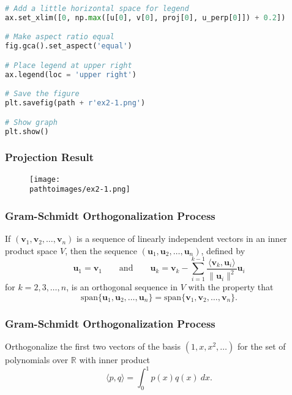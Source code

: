 \documentclass{beamer}
\newcommand{\pathtoimages}{/Users/charlesrambo/Desktop/Bootcamp24/Images}
\begin{document}
\begin{frame}[fragile]
\begin{multicols}{2}
\begin{lstlisting}[language=Python]
# Add a little horizontal space for legend
ax.set_xlim([0, np.max([u[0], v[0], proj[0], u_perp[0]]) + 0.2])

# Make aspect ratio equal
fig.gca().set_aspect('equal')

# Place legend at upper right
ax.legend(loc = 'upper right')

# Save the figure
plt.savefig(path + r'ex2-1.png')

# Show graph
plt.show()
\end{lstlisting}
\end{multicols}

\end{frame}

\begin{frame}[fragile]
\frametitle{Projection Result}
\begin{figure}
\centering
\texttt{[image: \\pathtoimages/ex2-1.png]}
\end{figure}
\end{frame}


\begin{frame}
\frametitle{Gram-Schmidt Orthogonalization Process}
\begin{Theorem}
If $({\boldsymbol v_1}, {\boldsymbol v_2}, \ldots, {\boldsymbol v_n})$ is a sequence of linearly independent vectors in an inner product space $V$, then the sequence $({\boldsymbol u_1}, {\boldsymbol u_2},\ldots, {\boldsymbol u_n})$, defined by
$$
{\boldsymbol u_1} = {\boldsymbol v_1}\qquad\text{and}\qquad {\boldsymbol u_k} = {\boldsymbol v_k} - \sum_{i = 1}^{k - 1} \frac{\langle {\boldsymbol v_k}, {\boldsymbol u_i}\rangle}{\| {\boldsymbol u_i}\|^2} {\boldsymbol u_i}
$$
for $k = 2, 3,\ldots, n$, is an orthogonal sequence in $V$ with the property that
$$
\text{span}\{{\boldsymbol u_1}, {\boldsymbol u_2},\ldots, {\boldsymbol u_n}\} = \text{span}\{{\boldsymbol v_1}, {\boldsymbol v_2},\ldots, {\boldsymbol v_n}\}.
$$
\end{Theorem}

\end{frame}

\begin{frame}[t]
\frametitle{Gram-Schmidt Orthogonalization Process}
\small
\begin{Example}
Orthogonalize the first two vectors of the basis $(1, x, x^2,\ldots)$ for the set of polynomials over $\mathbb{R}$ with inner product
$$
\langle p, q\rangle = \int_{0}^1 p(x)q(x)\ dx.
$$
\end{Example}


\end{frame}
\end{document}
